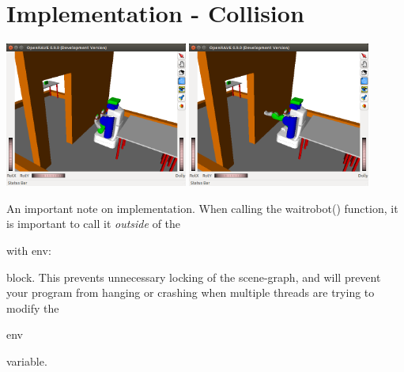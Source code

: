 \documentclass[10pt,letterpaper]{article}
\begin{document}
\section{Implementation - Collision}
\begin{center}
\includegraphics[width=0.45\textwidth]{HW1_collision_ss1}
\includegraphics[width=0.45\textwidth]{HW1_collision_ss2}
\end{center}
An important note on implementation. When calling the waitrobot() function, it is important to call it \emph{outside} of the \begin{texttt}with env:\end{texttt} block. This prevents unnecessary locking of the scene-graph, and will prevent your program from hanging or crashing when multiple threads are trying to modify the \begin{texttt}env\end{texttt} variable. 
\end{document}
